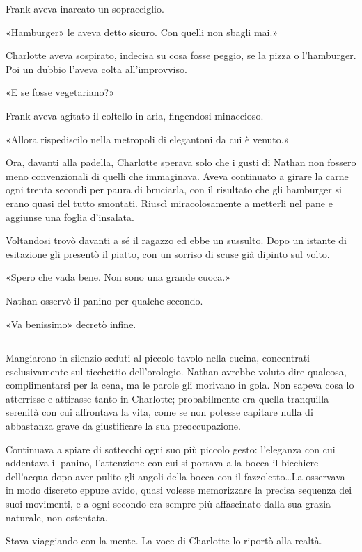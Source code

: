 Frank aveva inarcato un sopracciglio.

«Hamburger» le aveva detto sicuro. Con quelli non sbagli mai.»

Charlotte aveva sospirato, indecisa su cosa fosse peggio, se la pizza o l'hamburger. Poi un dubbio
l'aveva colta all'improvviso.

«E se fosse vegetariano?»

Frank aveva agitato il coltello in aria, fingendosi minaccioso.

«Allora rispediscilo nella metropoli di elegantoni da cui è venuto.»

Ora, davanti alla padella, Charlotte sperava solo che i gusti di Nathan non fossero meno
convenzionali di quelli che immaginava. Aveva continuato a girare la carne ogni trenta secondi per
paura di bruciarla, con il risultato che gli hamburger si erano quasi del tutto smontati. Riuscì
miracolosamente a metterli nel pane e aggiunse una foglia d'insalata.

Voltandosi trovò davanti a sé il ragazzo ed ebbe un sussulto. Dopo un istante di esitazione gli
presentò il piatto, con un sorriso di scuse già dipinto sul volto.

«Spero che vada bene. Non sono una grande cuoca.»

Nathan osservò il panino per qualche secondo.

«Va benissimo» decretò infine.

\plainbreak{1}

Mangiarono in silenzio seduti al piccolo tavolo nella cucina, concentrati esclusivamente sul
ticchettio dell'orologio. Nathan avrebbe voluto dire qualcosa, complimentarsi per la cena, ma le
parole gli morivano in gola. Non sapeva cosa lo atterrisse e attirasse tanto in Charlotte;
probabilmente era quella tranquilla serenità con cui affrontava la vita, come se non potesse
capitare nulla di abbastanza grave da giustificare la sua preoccupazione.

Continuava a spiare di sottecchi ogni suo più piccolo gesto: l'eleganza con cui addentava il panino,
l'attenzione con cui si portava alla bocca il bicchiere dell'acqua dopo aver pulito gli angoli della
bocca con il fazzoletto\dots La osservava in modo discreto eppure avido, quasi volesse memorizzare
la precisa sequenza dei suoi movimenti, e a ogni secondo era sempre più affascinato dalla sua grazia
naturale, non ostentata.

Stava viaggiando con la mente. La voce di Charlotte lo riportò alla realtà.

